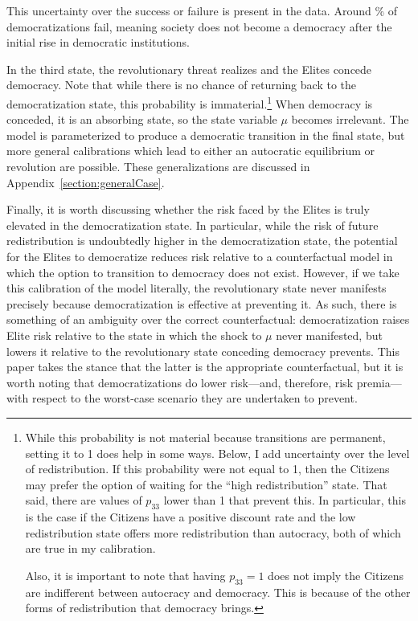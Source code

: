 This uncertainty over the success or failure is present in the data.  Around \pctDemFail\% of democratizations fail, meaning society does not become a democracy after the initial rise in democratic institutions.

In the third state, the revolutionary threat realizes and the Elites concede democracy. Note that while there is no chance of returning back to the democratization state, this probability is immaterial.\footnote{While this probability is not material because transitions are permanent, setting it to 1 does help in some ways. Below, I add uncertainty over the level of redistribution. If this probability were not equal to 1, then the Citizens may prefer the option of waiting for the ``high redistribution'' state. That said, there are values of $p_{33}$ lower than 1 that prevent this. In particular, this is the case if the Citizens have a positive discount rate and the low redistribution state offers more redistribution than autocracy, both of which are true in my calibration. \par Also, it is important to note that having $p_{33}=1$ does not imply the Citizens are indifferent between autocracy and democracy. This is because of the other forms of redistribution that democracy brings.} When democracy is conceded, it is an absorbing state, so the state variable $\mu$ becomes irrelevant. The model is parameterized to produce a democratic transition in the final state, but more general calibrations which lead to either an autocratic equilibrium or revolution are possible. These generalizations are discussed in Appendix~\ref{section:generalCase}.

\label{par:correct_counterfactual}
Finally, it is worth discussing whether the risk faced by the Elites is truly elevated in the democratization state. In particular, while the risk of future redistribution is undoubtedly higher in the democratization state, the potential for the Elites to democratize reduces risk relative to a counterfactual model in which the option to transition to democracy does not exist. However, if we take this calibration of the model literally, the revolutionary state never manifests precisely because democratization is effective at preventing it. As such, there is something of an ambiguity over the correct counterfactual: democratization raises Elite risk relative to the state in which the shock to $\mu$ never manifested, but lowers it relative to the revolutionary state conceding democracy prevents. This paper takes the stance that the latter is the appropriate counterfactual, but it is worth noting that democratizations do lower risk---and, therefore, risk premia---with respect to the worst-case scenario they are undertaken to prevent.

